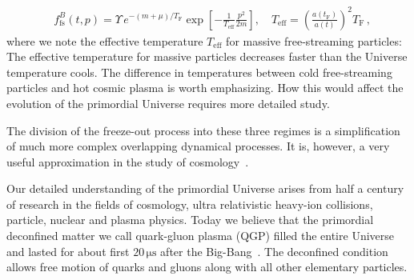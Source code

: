 \begin{itemize}
\begin{align}\label{freeStreamDistNR}
&f^B_\mathrm{fs}(t,p)=\Upsilon\,e^{-(m+\mu)/T_\mathrm{F}}\exp\left[-\frac{1}{ T_\mathrm{eff}}\frac{p^2}{2m}\right],\quad T_\mathrm{eff}=\left(\frac{a(t_\mathrm{F})}{a(t)}\right)^2T_\mathrm{F}\,,
\end{align}
where we note the effective temperature $T_\mathrm{eff}$ for massive free-streaming particles: The effective temperature for massive particles decreases faster than the Universe temperature cools. The difference in temperatures between cold free-streaming particles and hot cosmic plasma is worth emphasizing. How this would affect the evolution of the primordial Universe requires more detailed study. 
\end{itemize}

The division of the freeze-out process into these three regimes is a simplification of much more complex overlapping dynamical processes. It is, however, a very useful approximation in the study of cosmology~\cite{Rafelski:2023emw,Birrell:2012gg,Mangano:2005cc,Birrell:2014gea}.

Our detailed understanding of the primordial Universe arises from half a century of research in the fields of cosmology, ultra relativistic heavy-ion collisions, particle, nuclear and plasma physics. Today we believe that the primordial deconfined matter we call quark-gluon plasma (QGP) filled the entire Universe and lasted for about first $20\,\mathrm{\mu s}$ after the Big-Bang~. The deconfined condition allows free motion of quarks and gluons along with all other elementary particles. 

